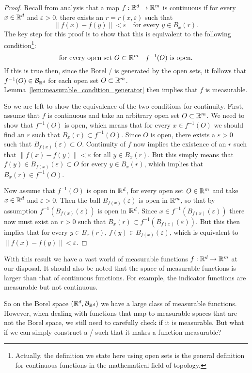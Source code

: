\begin{proof}
Recall from analysis that a map $f : \mathbb R^d \to \mathbb R^m$ is continuous if for every $x \in \mathbb R^d$ and $\varepsilon > 0$, there exists an $r = r(x,\varepsilon)$ such that 
\[
	\|f(x) - f(y)\| < \varepsilon \quad \text{for every } y \in B_x(r).
\]
The key step for this proof is to show that this is equivalent to the following condition\footnote{Actually, the definition we state here using open sets is the general definition for continuous functions in the mathematical field of topology.}:
\[
	\text{for every open set } O \subset \mathbb R^m \quad f^{-1}(O) \text{ is open}.
\]
If this is true then, since the Borel \sigalg/ is generated by the open sets, it follows that $f^{-1}(O) \in \mathcal B_{\mathbb R^d}$ for each open set $O \subset \mathbb R^m$. Lemma~\ref{lem:measurable_condition_generator} then implies that $f$ is measurable.

So we are left to show the equivalence of the two conditions for continuity. First, assume that $f$ is continuous and take an arbitrary open set $O \subset \mathbb R^m$. We need to show that $f^{-1}(O)$ is open, which means that for every $x \in f^{-1}(O)$ we should find an $r$ such that $B_x(r) \subset f^{-1}(O)$. Since $O$ is open, there exists a $\varepsilon > 0$ such that $B_{f(x)}(\varepsilon) \subset O$. Continuity of $f$ now implies the existence of an $r$ such that $\|f(x) - f(y)\| < \varepsilon$ for all $y \in B_x(r)$. But this simply means that $f(y) \in B_{f(x)}(\varepsilon) \subset O$ for every $y \in B_x(r)$, which implies that $B_x(r) \in f^{-1}(O)$.

Now assume that $f^{-1}(O)$ is open in $\mathbb R^d$, for every open set $O \in \mathbb R^m$ and take $x \in \mathbb R^d$ and $\varepsilon > 0$. Then the ball $B_{f(x)}(\varepsilon)$ is open in $\mathbb R^m$, so that by assumption $f^{-1}(B_{f(x)}(\varepsilon))$ is open in $\mathbb R^d$. Since $x \in f^{-1}(B_{f(x)}(\varepsilon))$ there now must exist an $r > 0$ such that $B_x(r) \subset f^{-1}(B_{f(x)}(\varepsilon))$. But this then implies that for every $y \in B_x(r)$, $f(y) \in B_{f(x)}(\varepsilon)$, which is equivalent to $\|f(x) - f(y)\| < \varepsilon$.
\end{proof}

With this result we have a vast world of measurable functions $f : \mathbb R^d \to \mathbb R^m$ at our disposal. It should also be noted that the space of measurable functions is larger than that of continuous functions. For example, the indicator functions are measurable but not continuous.

So on the Borel space $(\mathbb R^d, \mathcal B_{\mathbb R^d})$ we have a large class of measurable functions. However, when dealing with functions that map to measurable spaces that are not the Borel space, we still need to carefully check if it is measurable. But what if we can simply construct a \sigalg/ such that it makes a function measurable?

